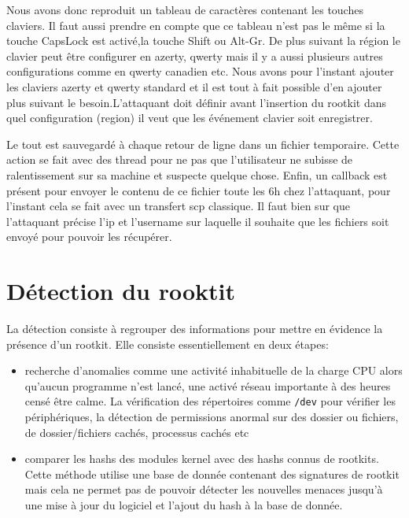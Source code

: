 \documentclass[12pt]{article}
\begin{document}
        Nous avons donc reproduit un tableau de caractères contenant les touches claviers. Il faut aussi prendre en compte que ce tableau n'est pas le même si la touche CapsLock est activé,la touche Shift ou Alt-Gr. De plus suivant la région le clavier peut être configurer en azerty, qwerty mais il y a aussi plusieurs autres configurations comme en qwerty canadien etc. Nous avons pour l'instant ajouter les claviers azerty et qwerty standard et il est tout à fait possible d'en ajouter plus suivant le besoin.L'attaquant doit définir avant l'insertion du rootkit dans quel configuration (region) il veut que les événement clavier soit enregistrer. 
        
        Le tout est sauvegardé à chaque retour de ligne dans un fichier temporaire. Cette action se fait avec des thread pour ne pas que l'utilisateur ne subisse de ralentissement sur sa machine et suspecte quelque chose. Enfin, un callback est présent pour envoyer le contenu de ce fichier toute les 6h chez l'attaquant, pour l'instant cela se fait avec un transfert scp classique. Il faut bien sur que l'attaquant précise l'ip et l'username sur laquelle il souhaite que les fichiers soit envoyé pour pouvoir les récupérer.
        
\section{Détection du rooktit}
    
    La détection consiste à regrouper des informations pour mettre en évidence la présence d'un rootkit. Elle consiste essentiellement en deux étapes\cite{detection}:
    \begin{itemize}
    	\item recherche d'anomalies comme une activité inhabituelle de la charge CPU alors qu'aucun programme n'est lancé, une activé réseau importante à des heures censé être calme. La vérification des répertoires comme \texttt{/dev} pour vérifier les périphériques, la détection de permissions anormal sur des dossier ou fichiers, de dossier/fichiers cachés, processus cachés etc
    	\item comparer les hashs des modules kernel avec des hashs connus de rootkits. Cette méthode utilise une base de donnée contenant des signatures de rootkit mais cela ne permet pas de pouvoir détecter les nouvelles menaces jusqu'à une mise à jour du logiciel et l'ajout du hash à la base de donnée. 
    \end{itemize}
    
\end{document}
